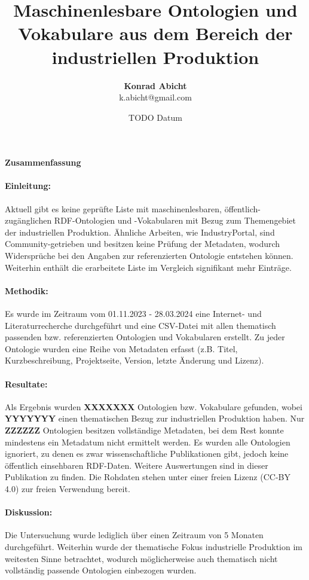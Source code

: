 \documentclass{article}
\title{Maschinenlesbare Ontologien und Vokabulare aus dem Bereich der industriellen Produktion}
\author{\textbf{Konrad Abicht} \\ k.abicht@gmail.com}
\date{TODO Datum}
\begin{document}
\maketitle

\paragraph{{\large Zusammenfassung}}

\paragraph{Einleitung:} Aktuell gibt es keine geprüfte Liste mit maschinenlesbaren, öffentlich-zugänglichen RDF-Ontologien und -Vokabularen mit Bezug zum Themengebiet der industriellen Produktion. Ähnliche Arbeiten, wie IndustryPortal, sind Community-getrieben und besitzen keine Prüfung der Metadaten, wodurch Widersprüche bei den Angaben zur referenzierten Ontologie entstehen können. Weiterhin enthält die erarbeitete Liste im Vergleich signifikant mehr Einträge.

\paragraph{Methodik:} Es wurde im Zeitraum vom 01.11.2023 - 28.03.2024 eine Internet- und Literaturrecherche durchgeführt und eine CSV-Datei mit allen thematisch passenden bzw. referenzierten Ontologien und Vokabularen erstellt. Zu jeder Ontologie wurden eine Reihe von Metadaten erfasst (z.B. Titel, Kurzbeschreibung, Projektseite, Version, letzte Änderung und Lizenz).

\paragraph{Resultate:} Als Ergebnis wurden \textbf{XXXXXXX} Ontologien bzw. Vokabulare gefunden, wobei \textbf{YYYYYYY} einen thematischen Bezug zur industriellen Produktion haben. Nur \textbf{ZZZZZZ} Ontologien besitzen vollständige Metadaten, bei dem Rest konnte mindestens ein Metadatum nicht ermittelt werden. Es wurden alle Ontologien ignoriert, zu denen es zwar wissenschaftliche Publikationen gibt, jedoch keine öffentlich einsehbaren RDF-Daten. Weitere Auswertungen sind in dieser Publikation zu finden. Die Rohdaten stehen unter einer freien Lizenz (CC-BY 4.0) zur freien Verwendung bereit.

\paragraph{Diskussion:} Die Untersuchung wurde lediglich über einen Zeitraum von 5 Monaten durchgeführt. Weiterhin wurde der thematische Fokus industrielle Produktion im weitesten Sinne betrachtet, wodurch möglicherweise auch thematisch nicht vollständig passende Ontologien einbezogen wurden.
\end{document}
